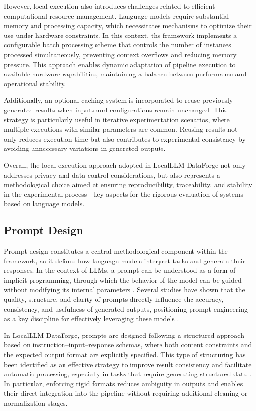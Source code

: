 \documentclass[pdflatex,sn-mathphys-num]{sn-jnl}%
\theoremstyle{thmstyleone}%
\theoremstyle{thmstyletwo}%
\theoremstyle{thmstylethree}%
\begin{document}
However, local execution also introduces challenges related to efficient computational resource management. Language models require substantial memory and processing capacity, which necessitates mechanisms to optimize their use under hardware constraints. In this context, the framework implements a configurable batch processing scheme that controls the number of instances processed simultaneously, preventing context overflows and reducing memory pressure. This approach enables dynamic adaptation of pipeline execution to available hardware capabilities, maintaining a balance between performance and operational stability.

Additionally, an optional caching system is incorporated to reuse previously generated results when inputs and configurations remain unchanged. This strategy is particularly useful in iterative experimentation scenarios, where multiple executions with similar parameters are common. Reusing results not only reduces execution time but also contributes to experimental consistency by avoiding unnecessary variations in generated outputs.

Overall, the local execution approach adopted in LocalLLM-DataForge not only addresses privacy and data control considerations, but also represents a methodological choice aimed at ensuring reproducibility, traceability, and stability in the experimental process—key aspects for the rigorous evaluation of systems based on language models.

\subsection{Prompt Design}

Prompt design constitutes a central methodological component within the framework, as it defines how language models interpret tasks and generate their responses. In the context of LLMs, a prompt can be understood as a form of implicit programming, through which the behavior of the model can be guided without modifying its internal parameters \cite{prompt_survey}. Several studies have shown that the quality, structure, and clarity of prompts directly influence the accuracy, consistency, and usefulness of generated outputs, positioning prompt engineering as a key discipline for effectively leveraging these models \cite{prompt_engineering_review}.

In LocalLLM-DataForge, prompts are designed following a structured approach based on instruction–input–response schemas, where both content constraints and the expected output format are explicitly specified. This type of structuring has been identified as an effective strategy to improve result consistency and facilitate automatic processing, especially in tasks that require generating structured data \cite{structured_prompting}. In particular, enforcing rigid formats reduces ambiguity in outputs and enables their direct integration into the pipeline without requiring additional cleaning or normalization stages.
\end{document}
